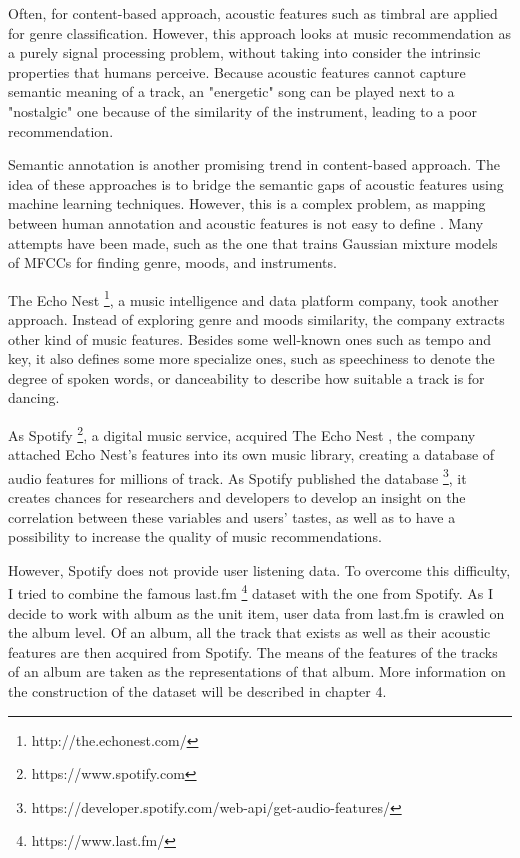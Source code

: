 Often, for content-based approach, acoustic features such as timbral are applied for genre classification. However, this approach looks at music recommendation as a purely signal processing problem, without taking into consider the intrinsic properties that humans perceive. Because acoustic features cannot capture semantic meaning of a track, an "energetic" song can be played next to a "nostalgic" one because of the similarity of the instrument, leading to a poor recommendation.

Semantic annotation is another promising trend in content-based approach. The idea of these approaches is to bridge the semantic gaps of acoustic features using machine learning techniques. However, this is a complex problem, as mapping between human annotation and acoustic features is not easy to define \cite{aucouturier2009sounds}. Many attempts have been made, such as the one that trains Gaussian mixture models of MFCCs for finding genre, moods, and instruments. 

The Echo Nest \footnote{http://the.echonest.com/}, a music intelligence and data platform company, took another approach. Instead of exploring genre and moods similarity, the company extracts other kind of music features. Besides some well-known ones such as tempo and key, it also defines some more specialize ones, such as speechiness to denote the degree of spoken words, or danceability to describe how suitable a track is for dancing. 

As Spotify \footnote{https://www.spotify.com}, a digital music service, acquired The Echo Nest \cite{press_2014}, the company attached Echo Nest's features into its own music library, creating a database of audio features for millions of track. As Spotify published the database \footnote{https://developer.spotify.com/web-api/get-audio-features/}, it creates chances for researchers and developers to develop an insight on the correlation between these variables and users' tastes, as well as to have a possibility to increase the quality of music recommendations.

However, Spotify does not provide user listening data. To overcome this difficulty, I tried to combine the famous last.fm \footnote{https://www.last.fm/} dataset with the one from Spotify. As I decide to work with album as the unit item, user data from last.fm is crawled on the album level. Of an album, all the track that exists as well as their acoustic features are then acquired from Spotify. The means of the features of the tracks of an album are taken as the representations of that album. More information on the construction of the dataset will be described in chapter 4. 

